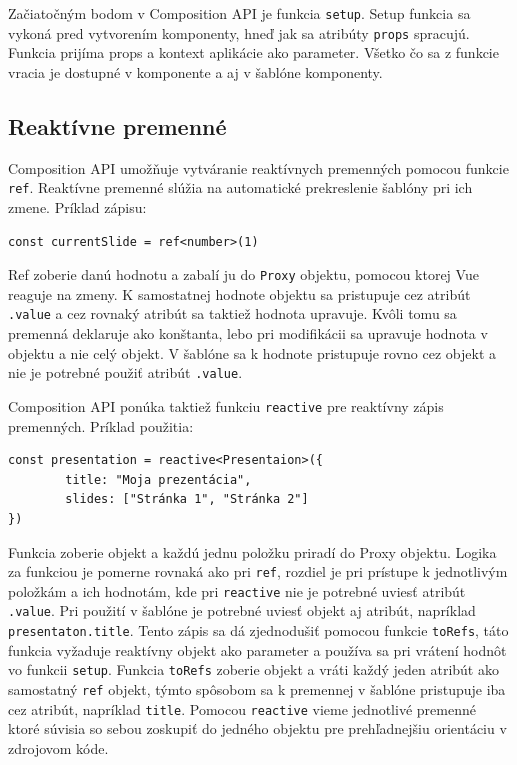 Začiatočným bodom v Composition API je funkcia \texttt{setup}. Setup funkcia sa vykoná pred vytvorením komponenty, hneď jak sa atribúty \texttt{props} spracujú. Funkcia prijíma props a kontext aplikácie ako parameter. Všetko čo sa z funkcie vracia je dostupné v komponente a aj v šablóne komponenty. 

\subsection*{Reaktívne premenné}
Composition API umožňuje vytváranie reaktívnych premenných pomocou funkcie \texttt{ref}. Reaktívne premenné slúžia na automatické prekreslenie šablóny pri ich zmene. Príklad zápisu: 
    \begin{verbatim}const currentSlide = ref<number>(1)\end{verbatim}
Ref zoberie danú hodnotu a zabalí ju do \texttt{Proxy} objektu, pomocou ktorej Vue reaguje na zmeny. K samostatnej hodnote objektu sa pristupuje cez atribút \texttt{.value} a cez rovnaký atribút sa taktiež hodnota upravuje. Kvôli tomu sa premenná deklaruje ako konštanta, lebo pri modifikácii sa upravuje hodnota v objektu a nie celý objekt. V šablóne sa k hodnote pristupuje rovno cez objekt a nie je potrebné použiť atribút \texttt{.value}. 

Composition API ponúka taktiež funkciu \texttt{reactive} pre reaktívny zápis premenných. Príklad použitia:
    \begin{verbatim}const presentation = reactive<Presentaion>({
        title: "Moja prezentácia",
        slides: ["Stránka 1", "Stránka 2"]
}) \end{verbatim}
Funkcia zoberie objekt a každú jednu položku priradí do Proxy objektu. Logika za funkciou je pomerne rovnaká ako pri \texttt{ref}, rozdiel je pri prístupe k jednotlivým položkám a ich hodnotám, kde pri \texttt{reactive} nie je potrebné uviesť atribút \texttt{.value}. Pri použití v šablóne je potrebné uviesť objekt aj atribút, napríklad \texttt{presentaton.title}. Tento zápis sa dá zjednodušiť pomocou funkcie \texttt{toRefs}, táto funkcia vyžaduje reaktívny objekt ako parameter a používa sa pri vrátení hodnôt vo funkcii \texttt{setup}. Funkcia \texttt{toRefs} zoberie objekt a vráti každý jeden atribút ako samostatný \texttt{ref} objekt, týmto spôsobom sa k premennej v šablóne pristupuje iba cez atribút, napríklad \texttt{title}. Pomocou \texttt{reactive} vieme jednotlivé premenné ktoré súvisia so sebou zoskupiť do jedného objektu pre prehľadnejšiu orientáciu v zdrojovom kóde. 

